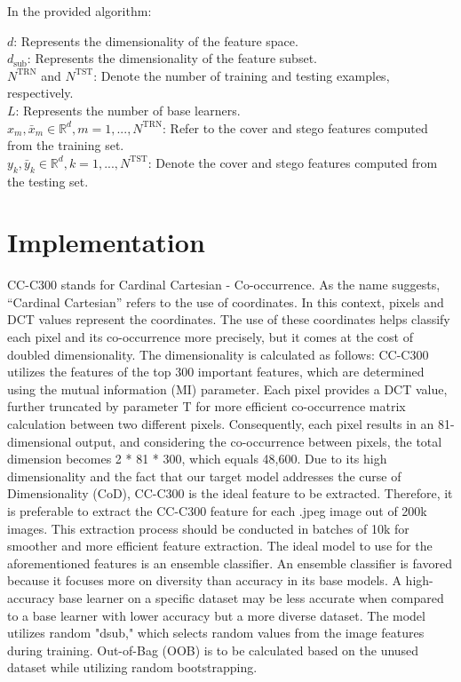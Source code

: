    \begin{flushleft}
    In the provided algorithm:\\
    \end{flushleft}
     $d$: Represents the dimensionality of the feature space.\\
     $d_{\text{sub}}$: Represents the dimensionality of the feature subset.\\
     $N^{\text{TRN}}$ and $N^{\text{TST}}$: Denote the number of training and testing examples, respectively.\\
     $L$: Represents the number of base learners.\\
     $x_m, \bar{x}_m \in \mathbb{R}^d, m=1,...,N^{\text{TRN}}$: Refer to the cover and stego features computed from the training set.\\
     $y_k, \bar{y}_k \in \mathbb{R}^d, k=1,...,N^{\text{TST}}$: Denote the cover and stego features computed from the testing set.\\

\section{Implementation}
CC-C300\cite{8} stands for Cardinal Cartesian - Co-occurrence. As the name suggests, ``Cardinal Cartesian'' refers to the use of coordinates. In this context, pixels and DCT values represent the coordinates. The use of these coordinates helps classify each pixel and its co-occurrence more precisely, but it comes at the cost of doubled dimensionality. The dimensionality is calculated as follows: CC-C300 utilizes the features of the top 300 important features, which are determined using the mutual information (MI) parameter. Each pixel provides a DCT value, further truncated by parameter T for more efficient co-occurrence matrix calculation between two different pixels. Consequently, each pixel results in an 81-dimensional output, and considering the co-occurrence between pixels, the total dimension becomes 2 * 81 * 300, which equals 48,600.
Due to its high dimensionality and the fact that our target model addresses the curse of Dimensionality (CoD), CC-C300 is the ideal feature to be extracted. Therefore, it is preferable to extract the CC-C300 feature for each .jpeg image out of 200k images. This extraction process should be conducted in batches of 10k for smoother and more efficient feature extraction.\vspace{0.2cm}
The ideal model to use for the aforementioned features is an ensemble classifier. An ensemble classifier is favored because it focuses more on diversity than accuracy in its base models. A high-accuracy base learner on a specific dataset may be less accurate when compared to a base learner with lower accuracy but a more diverse dataset. The model utilizes random "dsub," which selects random values from the image features during training. Out-of-Bag (OOB) is to be calculated based on the unused dataset while utilizing random bootstrapping.

